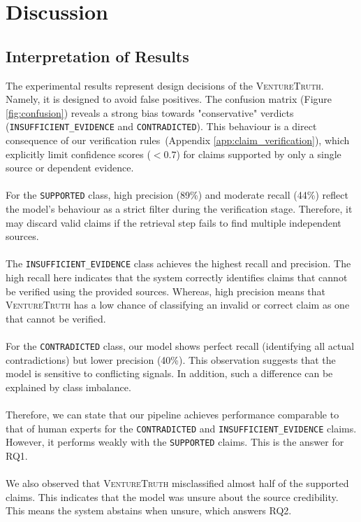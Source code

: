 \section{Discussion}

\subsection{Interpretation of Results}
The experimental results represent design decisions of the \textsc{VentureTruth}. Namely, it is designed to avoid false positives.
The confusion matrix (Figure \ref{fig:confusion}) reveals a strong bias towards "conservative" verdicts (\texttt{INSUFFICIENT\_EVIDENCE} and \texttt{CONTRADICTED}). This behaviour is a direct consequence of our verification rules~(Appendix \ref{app:claim_verification}), which explicitly limit confidence scores ($<0.7$) for claims supported by only a single source or dependent evidence.
\\
\\
For the \texttt{SUPPORTED} class, high precision (89\%) and moderate recall (44\%) reflect the model's behaviour as a strict filter during the verification stage. Therefore, it may discard valid claims if the retrieval step fails to find multiple independent sources.
\\
\\
The \texttt{INSUFFICIENT\_EVIDENCE} class achieves the highest recall and precision. The high recall here indicates that the system correctly identifies claims that cannot be verified using the provided sources. Whereas, high precision means that \textsc{VentureTruth} has a low chance of classifying an invalid or correct claim as one that cannot be verified.
\\
\\
For the \texttt{CONTRADICTED} class, our model shows perfect recall (identifying all actual contradictions) but lower precision (40\%). This observation suggests that the model is sensitive to conflicting signals. In addition, such a difference can be explained by class imbalance.
\\
\\
Therefore, we can state that our pipeline achieves performance comparable to that of human experts for the \texttt{CONTRADICTED} and \texttt{INSUFFICIENT\_EVIDENCE} claims. However, it performs weakly with the \texttt{SUPPORTED} claims. This is the answer for RQ1.
\\
\\
We also observed that \textsc{VentureTruth} misclassified almost half of the supported claims. This indicates that the model was unsure about the source credibility. This means the system abstains when unsure, which answers RQ2.

